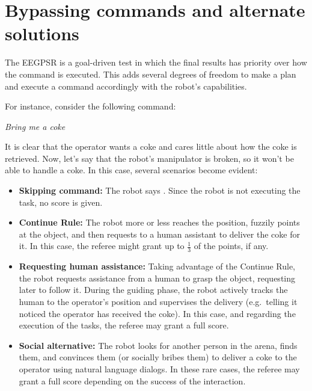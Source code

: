 \section{Bypassing commands and alternate solutions}
The EEGPSR is a goal-driven test in which the final results has priority over how the command is executed.
This adds several degrees of freedom to make a plan and execute a command accordingly with the robot's capabilities.

For instance, consider the following command:

\begin{center}
\noindent\textit{Bring me a coke}
\end{center}

It is clear that the operator wants a coke and cares little about how the coke is retrieved. Now, let's say that the robot's manipulator is broken, so it won't be able to handle a coke. In this case, several scenarios become evident:

\begin{itemize}
	\item \textbf{Skipping command:} The robot says . Since the robot is not executing the task, no score is given.

	\item \textbf{Continue Rule:} The robot more or less reaches the position, fuzzily points at the object, and then requests to a human assistant to deliver the coke for it. In this case, the referee might grant up to $\frac{1}{3}$ of the points, if any.

	\item \textbf{Requesting human assistance:} Taking advantage of the Continue Rule, the robot requests assistance from a human to grasp the object, requesting later to follow it. During the guiding phase, the robot actively tracks the human to the operator's position and supervises the delivery (e.g.~telling it noticed the operator has received the coke). In this case, and regarding the execution of the tasks, the referee may grant a full score.

	\item \textbf{Social alternative:} The robot looks for another person in the arena, finds them, and convinces them (or socially bribes them) to deliver a coke to the operator using natural language dialogs. In these rare cases, the referee may grant a full score depending on the success of the interaction.
\end{itemize}

